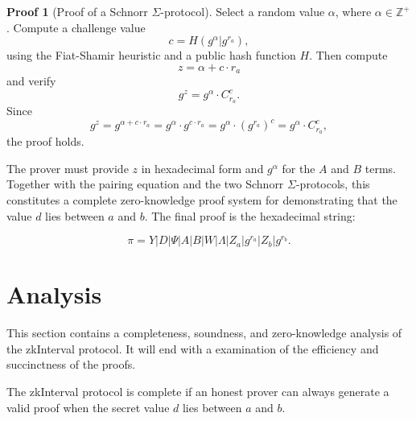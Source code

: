 \documentclass{iacrcc}
\theoremstyle{definition}
\newtheorem{namedproof}{Proof}
\begin{document}
\begin{namedproof}[Proof of a Schnorr $\Sigma$-protocol]
Select a random value \( \alpha \), where \( \alpha \in \mathbb{Z}^+ \). Compute a challenge value
\begin{equation}
c = H(g^{\alpha} | g^{r_{a}}), 
\end{equation}
using the Fiat-Shamir heuristic and a public hash function \( H \). Then compute 
\begin{equation}
z = \alpha + c \cdot r_{a}
\end{equation}
and verify
\begin{equation}
g^{z} = g^{\alpha} \cdot C_{r_a}^{c}.
\end{equation}
Since 
\begin{equation}
g^{z} = g^{\alpha + c \cdot r_{a}} = g^{\alpha} \cdot g^{c \cdot r_{a}} = g^{\alpha} \cdot (g^{r_{a}})^{c} = g^{\alpha} \cdot C_{r_a}^{c},
\end{equation}
the proof holds.
\end{namedproof}

The prover must provide \( z \) in hexadecimal form and \( g^{\alpha} \) for the \( A \) and \( B \) terms. Together with the pairing equation and the two Schnorr $\Sigma$-protocols, this constitutes a complete zero-knowledge proof system for demonstrating that the value \( d \) lies between \( a \) and \( b \). The final proof is the hexadecimal string:

\begin{equation}
\pi = Y | D | \Psi | A | B | W | \Lambda | Z_{a} | g^{r_{a}} | Z_{b} | g^{r_{b}}.
\end{equation}

\section{Analysis}

This section contains a completeness, soundness, and zero-knowledge analysis of the zkInterval protocol. It will end with a examination of the efficiency and succinctness of the proofs.

The zkInterval protocol is complete if an honest prover can always generate a valid proof when the secret value \( d \) lies between \( a \) and \( b \).
\end{document}
